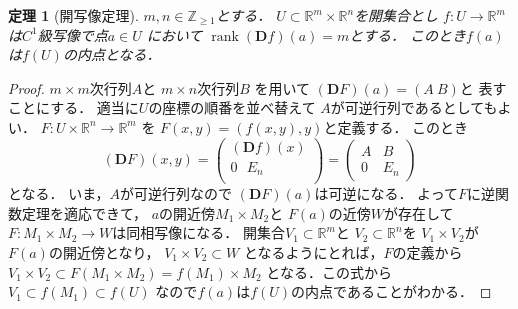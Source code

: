 \documentclass[leqno, a4paper, 12pt]{jsarticle}
\newtheorem{thm}{定理}
\newcommand{\zz}{\mathbb{Z}}
\newcommand{\rr}{\mathbb{R}}
\DeclareMathOperator{\rank}{rank}
\newcommand{\ddd}{\mathbf{D}}
\begin{document}
\begin{thm}[開写像定理]
$m, n\in \zz_{\ge 1}$とする．
$U\subset \rr^{m}\times \rr^{n}$を開集合とし
$f: U\to \rr^{m}$
は$C^{1}$級写像で点$a\in U$
において
$\rank(\ddd f)(a)=m$とする．
このとき$f(a)$は$f(U)$の内点となる．
\end{thm}
\begin{proof}
$m\times m$次行列$A$と
$m\times n$次行列$B$
を用いて
$(\ddd F)(a)=(A\  B)$と
表すことにする．
適当に$U$の座標の順番を並べ替えて
$A$が可逆行列であるとしてもよい．
$F: U\times \rr^{n}\to \rr^{m}$
を
$F(x, y)=(f(x, y), y)$と定義する．
このとき
\[
(\ddd F)(x, y)=
\begin{pmatrix}
(\ddd f)(x) \\
0 \ \ \  E_{n} \\
\end{pmatrix}
=
\begin{pmatrix}
A & B\\
0 & E_{n}
\end{pmatrix}
\]
となる．
いま，$A$が可逆行列なので
$(\ddd F)(a)$は可逆になる．
よって$F$に逆関数定理を適応できて，
$a$の開近傍$M_{1}\times M_{2}$と
$F(a)$の近傍$W$が存在して
$F: M_{1}\times M_{2}\to W$は同相写像になる．
開集合$V_{1}\subset \rr^{m}$と
$V_{2}\subset \rr^{n}$を
$V_{1}\times V_{2}$が$F(a)$の開近傍となり，
$V_{1}\times V_{2}\subset W$
となるようにとれば，$F$の定義から
$V_{1}\times V_{2}\subset F(M_{1}\times M_{2})=f(M_{1})\times M_{2}$
となる．この式から$V_{1}\subset f(M_{1})\subset f(U)$
なので$f(a)$は$f(U)$の内点であることがわかる．
\end{proof}
\end{document}
